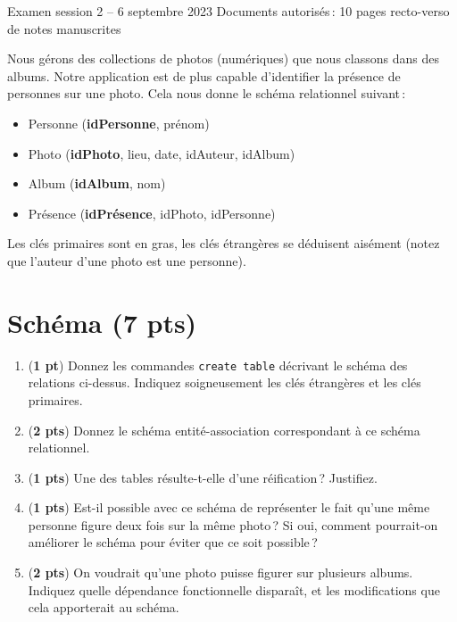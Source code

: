 %
%
%
{Examen session 2 -- 6 septembre 2023}%
{Documents autorisés\,: 10 pages recto-verso de notes manuscrites}%

Nous gérons des collections de photos (numériques) que nous classons dans des albums. 
Notre application est de plus capable d'identifier la présence de personnes sur une
photo. Cela nous donne le schéma relationnel suivant\,:

      \begin{itemize}
        \item Personne (\textbf{idPersonne}, prénom)
        \item Photo (\textbf{idPhoto}, lieu, date, idAuteur, idAlbum)
        \item Album (\textbf{idAlbum}, nom)
        \item  Présence (\textbf{idPrésence}, idPhoto, idPersonne)
       \end{itemize}

Les clés primaires sont en gras, les clés étrangères se déduisent aisément (notez que l'auteur
d'une photo est une personne).

\section{Schéma (7 pts)}

\begin{enumerate}

   \item ({\bf 1 pt}) Donnez les commandes {\tt create table} décrivant
         le schéma des relations ci-dessus. Indiquez soigneusement
         les clés étrangères et les clés primaires.
   \item  ({\bf 2 pts}) Donnez le schéma entité-association correspondant à ce schéma relationnel.
   \item ({\bf 1 pts}) Une des tables résulte-t-elle d'une réification\,? Justifiez.
   \item ({\bf 1 pts}) Est-il possible avec ce schéma de représenter le fait qu'une même personne 
   figure deux fois sur la même photo\,? Si oui, comment pourrait-on améliorer le schéma pour éviter 
   que ce soit possible\,?
 
 \item ({\bf 2 pts}) On voudrait qu'une photo puisse figurer sur plusieurs albums. Indiquez quelle
 dépendance fonctionnelle disparaît, et les modifications que cela apporterait au schéma.

\end{enumerate}


